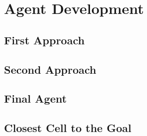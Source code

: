 \chapter{Agent Development}
\label{cha:agent_development}

\section{First Approach}
\label{sec:first_approach}

\section{Second Approach}
\label{sec:second_approach}

\section{Final Agent}
\label{sec:final_agent}

\section{Closest Cell to the Goal}
\label{sec:closest_cell_to_the_goal}
